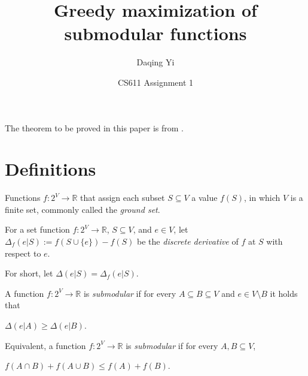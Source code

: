 \documentclass[12pt]{article}
\begin{document}
\title{\textsf{Greedy maximization of submodular functions}}
\author{\textsf{Daqing Yi}}
\date{\textsf{CS611 Assignment 1}}

\maketitle



The theorem to be proved in this paper is from \cite{krause2012submodular}.

\section{Definitions}

\begin{mydef}
\label{def:sef_func}
Functions $ f: 2^{V} \rightarrow \mathbb{R} $ that assign each subset $ S \subseteq V $ a value $ f(S) $, in which $ V $ is a finite set, commonly called the \emph{ground set}.
\end{mydef}

\begin{mydef}
\label{def:dis_der}
For a set function $ f: 2^{V} \rightarrow \mathbb{R} $, $ S \subseteq V $, and $ e \in V $, let $ \Delta_{f}(e|S):= f(S \cup \{e\}) - f(S) $ be the \emph{discrete derivative} of $ f $ at $ S $ with respect to $ e $. 
\end{mydef}

For short, let $ \Delta(e|S) = \Delta_{f}(e|S) $.

\begin{mydef}
\label{def:submodular}
A function $ f: 2^{V} \rightarrow \mathbb{R} $ is \emph{submodular} if for every $ A \subseteq B \subseteq V $ and $ e\in V \setminus B $ it holds that
\begin{center}
$ \Delta(e | A ) \geq \Delta(e | B) $.
\end{center}

Equivalent, a function $ f: 2^{V} \rightarrow \mathbb{R} $ is \emph{submodular} if for every $ A, B \subseteq V $,
\begin{center}
$ f(A \cap B) + f(A \cup B) \leq f(A) + f(B) $.
\end{center}
\end{mydef}
\end{document}
